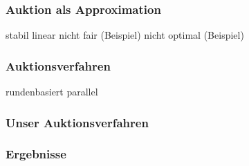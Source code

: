 \subsubsection{Auktion als Approximation}
stabil
linear
nicht fair (Beispiel)
nicht optimal (Beispiel)

\subsubsection{Auktionsverfahren}
rundenbasiert
parallel

\subsubsection{Unser Auktionsverfahren}


\subsubsection{Ergebnisse}